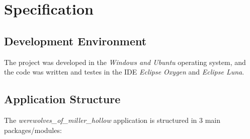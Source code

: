 \documentclass{article}
\begin{document}
\section{Specification}
\subsection{Development Environment}
The project was developed in the \textit{Windows and Ubuntu} operating system, and the code was written and testes in the IDE \textit{Eclipse Oxygen} and \textit{Eclipse Luna}. 

\subsection{Application Structure}
The \textit{werewolves\_of\_miller\_hollow} application is structured in 3 main packages/modules:
\end{document}
